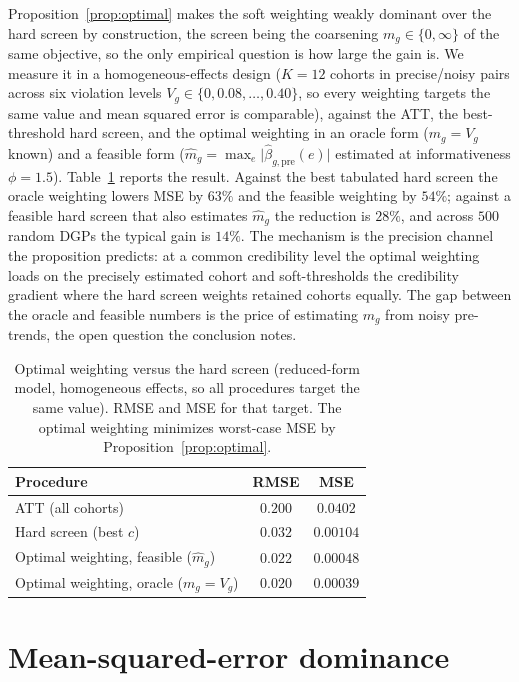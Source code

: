 \documentclass[12pt]{article}
\theoremstyle{remark}
\begin{document}
Proposition~\ref{prop:optimal} makes the soft weighting weakly dominant over the hard screen by
construction, the screen being the coarsening $m_g\in\{0,\infty\}$ of the same objective, so the only
empirical question is how large the gain is. We measure it in a homogeneous-effects design ($K=12$ cohorts
in precise/noisy pairs across six violation levels $V_g\in\{0,0.08,\dots,0.40\}$, so every weighting targets
the same value and mean squared error is comparable), against the ATT, the best-threshold hard screen, and
the optimal weighting in an oracle form ($m_g=V_g$ known) and a feasible form
($\hat m_g=\max_e\lvert\hat\beta_{g,\mathrm{pre}}(e)\rvert$ estimated at informativeness $\phi=1.5$).
Table~\ref{tab:prop11} reports the result. Against the best tabulated hard screen the oracle weighting lowers
MSE by $63\%$ and the feasible weighting by $54\%$; against a feasible hard screen that also estimates
$\hat m_g$ the reduction is $28\%$, and across $500$ random DGPs the typical gain is $14\%$. The mechanism is
the precision channel the proposition predicts: at a common credibility level the optimal weighting loads on
the precisely estimated cohort and soft-thresholds the credibility gradient where the hard screen weights
retained cohorts equally. The gap between the oracle and feasible numbers is the price of estimating $m_g$
from noisy pre-trends, the open question the conclusion notes.

\begin{table}[t]
\centering
\caption{Optimal weighting versus the hard screen (reduced-form model, homogeneous effects, so all
procedures target the same value). RMSE and MSE for that target. The optimal weighting minimizes worst-case
MSE by Proposition~\ref{prop:optimal}.}
\label{tab:prop11}
\begin{tabular}{lcc}
\toprule
Procedure & RMSE & MSE \\
\midrule
ATT (all cohorts) & $0.200$ & $0.0402$ \\
Hard screen (best $c$) & $0.032$ & $0.00104$ \\
Optimal weighting, feasible ($\hat m_g$) & $0.022$ & $0.00048$ \\
Optimal weighting, oracle ($m_g=V_g$) & $0.020$ & $0.00039$ \\
\bottomrule
\end{tabular}
\end{table}

\section{Mean-squared-error dominance}\label{app:mse}
\end{document}
